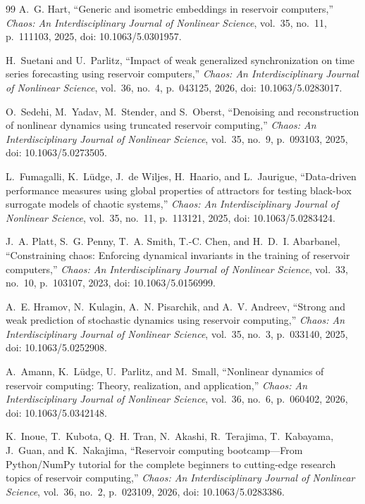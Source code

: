 \documentclass[aip,cha,reprint,amsmath,amssymb]{revtex4-2}
\begin{document}
\begin{thebibliography}{99}
A.~G. Hart, ``Generic and isometric embeddings in reservoir computers,'' \emph{Chaos: An Interdisciplinary Journal of Nonlinear Science}, vol.~35, no.~11, p.~111103, 2025, doi: 10.1063/5.0301957.

H.~Suetani and U.~Parlitz, ``Impact of weak generalized synchronization on time series forecasting using reservoir computers,'' \emph{Chaos: An Interdisciplinary Journal of Nonlinear Science}, vol.~36, no.~4, p.~043125, 2026, doi: 10.1063/5.0283017.

O.~Sedehi, M.~Yadav, M.~Stender, and S.~Oberst, ``Denoising and reconstruction of nonlinear dynamics using truncated reservoir computing,'' \emph{Chaos: An Interdisciplinary Journal of Nonlinear Science}, vol.~35, no.~9, p.~093103, 2025, doi: 10.1063/5.0273505.

L.~Fumagalli, K.~L{\"u}dge, J.~de Wiljes, H.~Haario, and L.~Jaurigue, ``Data-driven performance measures using global properties of attractors for testing black-box surrogate models of chaotic systems,'' \emph{Chaos: An Interdisciplinary Journal of Nonlinear Science}, vol.~35, no.~11, p.~113121, 2025, doi: 10.1063/5.0283424.

J.~A. Platt, S.~G. Penny, T.~A. Smith, T.-C. Chen, and H.~D.~I. Abarbanel, ``Constraining chaos: Enforcing dynamical invariants in the training of reservoir computers,'' \emph{Chaos: An Interdisciplinary Journal of Nonlinear Science}, vol.~33, no.~10, p.~103107, 2023, doi: 10.1063/5.0156999.

A.~E. Hramov, N.~Kulagin, A.~N. Pisarchik, and A.~V. Andreev, ``Strong and weak prediction of stochastic dynamics using reservoir computing,'' \emph{Chaos: An Interdisciplinary Journal of Nonlinear Science}, vol.~35, no.~3, p.~033140, 2025, doi: 10.1063/5.0252908.

A.~Amann, K.~L{\"u}dge, U.~Parlitz, and M.~Small, ``Nonlinear dynamics of reservoir computing: Theory, realization, and application,'' \emph{Chaos: An Interdisciplinary Journal of Nonlinear Science}, vol.~36, no.~6, p.~060402, 2026, doi: 10.1063/5.0342148.

K.~Inoue, T.~Kubota, Q.~H. Tran, N.~Akashi, R.~Terajima, T.~Kabayama, J.~Guan, and K.~Nakajima, ``Reservoir computing bootcamp---From Python/NumPy tutorial for the complete beginners to cutting-edge research topics of reservoir computing,'' \emph{Chaos: An Interdisciplinary Journal of Nonlinear Science}, vol.~36, no.~2, p.~023109, 2026, doi: 10.1063/5.0283386.


\end{thebibliography}
\end{document}
